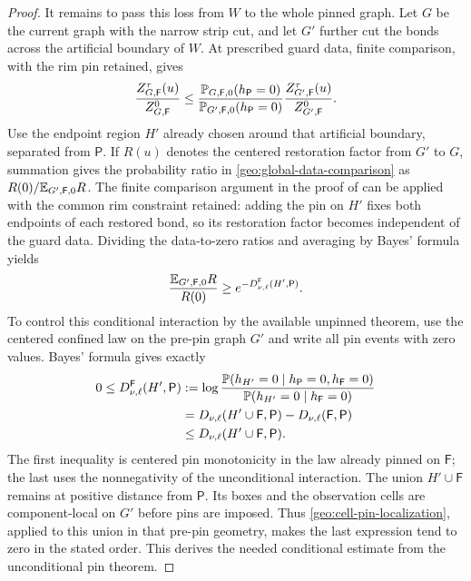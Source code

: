 \begin{proof}
It remains to pass this loss from \(W\) to the whole pinned graph.
Let \(G\) be the current graph with the narrow strip cut, and let
\(G'\) further cut the bonds across the artificial boundary of \(W\).
At prescribed guard data, finite comparison, with the rim pin retained,
gives
\begin{equation}\label{geo:global-data-comparison}
 \frac{Z_{G,\mathsf F}^\tau(u)}{Z_{G,\mathsf F}^0}
 \le
 \frac{\mathbb P_{G,\mathsf F,0}(h_{\mathsf P}=0)}
      {\mathbb P_{G',\mathsf F,0}(h_{\mathsf P}=0)}
 \frac{Z_{G',\mathsf F}^\tau(u)}{Z_{G',\mathsf F}^0}.
\end{equation}
Use the endpoint region \(H'\) already chosen around that artificial
boundary, separated from \(\mathsf P\).
If \(R(u)\) denotes the centered restoration factor from \(G'\) to
\(G\), summation gives the probability ratio in
\eqref{geo:global-data-comparison} as \(R(0)/\mathbb E_{G',\mathsf F,0}R\).
The finite comparison argument in the proof of \cite[Lemma~3.9]{C}
can be applied with the common rim constraint retained: adding the
pin on \(H'\) fixes both endpoints of each restored bond, so its
restoration factor becomes independent of the guard data.  Dividing
the data-to-zero ratios and averaging by Bayes' formula yields
\[
 \frac{\mathbb E_{G',\mathsf F,0}R}{R(0)}
       \ge e^{-D^{\mathsf F}_{\nu,\ell}(H',\mathsf P)}.
\]
To control this conditional interaction by the available unpinned
theorem, use the centered confined law on the pre-pin graph \(G'\) and
write all pin events with zero values.  Bayes' formula gives exactly
\begin{equation}\label{geo:conditional-pin-identity}
 \begin{split}
 0\le D^{\mathsf F}_{\nu,\ell}(H',\mathsf P)
 &:=\log\frac{\mathbb P(h_{H'}=0\mid h_{\mathsf P}=0,h_{\mathsf F}=0)}
                 {\mathbb P(h_{H'}=0\mid h_{\mathsf F}=0)}\\
 &=D_{\nu,\ell}(H'\cup\mathsf F,\mathsf P)
                   -D_{\nu,\ell}(\mathsf F,\mathsf P)\\
 &\le D_{\nu,\ell}(H'\cup\mathsf F,\mathsf P).
 \end{split}
\end{equation}
The first inequality is centered pin monotonicity in the law already
pinned on \(\mathsf F\); the last uses the nonnegativity of the
unconditional interaction.  The union \(H'\cup\mathsf F\) remains
at positive distance from \(\mathsf P\).  Its boxes and the observation
cells are component-local on \(G'\) before pins are imposed.
Thus \eqref{geo:cell-pin-localization}, applied to this union in that
pre-pin geometry, makes the last expression tend to zero in the stated
order.  This derives the needed conditional estimate from the
unconditional pin theorem.


\end{proof}
